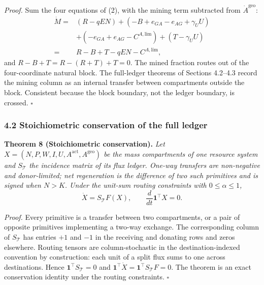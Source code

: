 \documentclass[11pt]{article}
\begin{document}
\emph{Proof.} Sum the four equations of (2), with the mining term subtracted from \(\dot A^{\mathrm{geo}}\): \[\begin{aligned} \dot M = { }& (R - qEN) + (-B + e_{GA} - e_{AG} + \gamma_U U) \\
  { }& + (-e_{GA} + e_{AG} - C^{A,\mathrm{lim}}) + (T - \gamma_U U) \\[2pt]
  ={}& R - B + T - qEN - C^{A,\mathrm{lim}}, \end{aligned}\] and \(R - B + T = R - (R + T) + T = 0\). The mined fraction routes out of the four-coordinate natural block. The full-ledger theorems of Sections 4.2--4.3 record the mining column as an internal transfer between compartments outside the block. Consistent because the block boundary, not the ledger boundary, is crossed. \ensuremath{\square}

\subsubsection{4.2 Stoichiometric conservation of the full
ledger}\label{stoichiometric-conservation-of-the-full-ledger}

\textbf{Theorem 8 (Stoichiometric conservation).} \emph{Let
\(X = (N, P, W, I, U, A^{\mathrm{act}}, A^{\mathrm{geo}})\) be the mass
compartments of one resource system and \(S_{\mathcal{T}}\) the
incidence matrix of its flux ledger. One-way transfers are non-negative
and donor-limited; net regeneration is the difference of two such
primitives and is signed when \(N > K\). Under the unit-sum routing
constraints with \(0 \le \alpha \le 1\),}
\[\dot X = S_{\mathcal{T}} F(X), \qquad \frac{d}{dt}\mathbf{1}^\top X = 0.\]

\emph{Proof.} Every primitive is a transfer between two compartments, or a pair of opposite primitives implementing a two-way exchange. The corresponding column of \(S_{\mathcal{T}}\) has entries \(+1\) and \(-1\) in the receiving and donating rows and zeros elsewhere. Routing tensors are column-stochastic in the destination-indexed convention by construction: each unit of a split flux sums to one across destinations. Hence \(\mathbf{1}^\top S_{\mathcal{T}} = 0\) and \(\mathbf{1}^\top \dot X = \mathbf{1}^\top S_{\mathcal{T}} F = 0\). The theorem is an exact conservation identity under the routing constraints. \ensuremath{\square}
\end{document}

